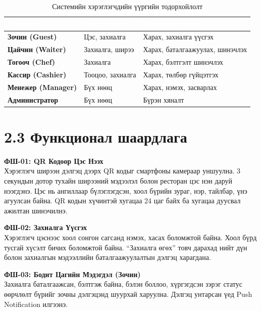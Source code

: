\begin{table}[htbp]
\caption{Системийн хэрэглэгчдийн үүргийн тодорхойлолт}
\label{tab:roles}
\centering
\begin{tabularx}{\textwidth}{|>{\bfseries}X|X|X|}
\hline
\rowcolor{TableHeader}\textcolor{white}{\textbf{Хэрэглэгч}}
  & \textcolor{white}{\textbf{Хандах нөөц}}
  & \textcolor{white}{\textbf{Боломжит үйлдэл}} \\ \hline
Зочин (Guest)       & Цэс, захиалга        & Харах, захиалга үүсгэх \\ \hline
Цайчин (Waiter)     & Захиалга, ширээ      & Харах, баталгаажуулах, шинэчлэх \\ \hline
Тогооч (Chef)       & Захиалга             & Харах, бэлтгэлт шинэчлэх \\ \hline
Кассир (Cashier)    & Тооцоо, захиалга     & Харах, төлбөр гүйцэтгэх \\ \hline
Менежер (Manager)   & Бүх нөөц            & Харах, нэмэх, засварлах \\ \hline
Администратор       & Бүх нөөц            & Бүрэн хяналт \\ \hline
\end{tabularx}
\end{table}

\section{2.3 Функционал шаардлага}

\textbf{ФШ-01: QR Кодоор Цэс Нээх}\\
Хэрэглэгч ширээн дэлгэц дээрх QR кодыг смартфоны камераар уншуулна.
3 секундын дотор тухайн ширээний мэдээлэл болон ресторан цэс нэн даруй нээгдэнэ.
Цэс нь ангиллаар бүлэглэгдсэн, хоол бүрийн зураг, нэр, тайлбар, үнэ агуулсан байна.
QR кодын хүчинтэй хугацаа 24 цаг байх ба хугацаа дуусвал ажилтан шинэчилнэ.

\textbf{ФШ-02: Захиалга Үүсгэх}\\
Хэрэглэгч цэснээс хоол сонгон сагсанд нэмэх, хасах боломжтой байна.
Хоол бүрд тусгай хүсэлт бичих боломжтой байна.
``Захиалга өгөх'' товч дарахад нийт дүн болон захиалгын мэдээллийн баталгаажуулалтын
дэлгэц харагдана.

\textbf{ФШ-03: Бодит Цагийн Мэдэгдэл (Зочин)}\\
Захиалга баталгаажсан, бэлтгэж байна, бэлэн боллоо, хүргэгдсэн зэрэг статус
өөрчлөлт бүрийг зочны дэлгэцэнд шуурхай харуулна. Дэлгэц унтарсан үед Push
Notification илгээнэ.

